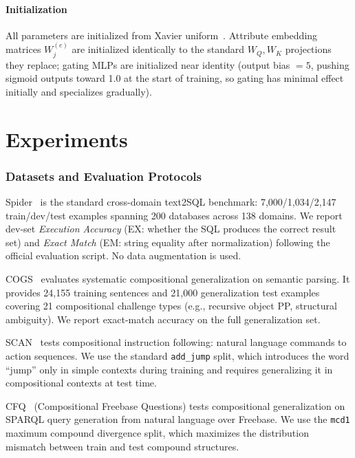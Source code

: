 \documentclass[conference]{IEEEtran}
\begin{document}
\paragraph{Initialization}
All parameters are initialized from Xavier uniform~\cite{vaswani2017attention}. Attribute embedding matrices $W_j^{(e)}$ are initialized identically to the standard $W_Q, W_K$ projections they replace; gating MLPs are initialized near identity (output bias $= 5$, pushing sigmoid outputs toward 1.0 at the start of training, so gating has minimal effect initially and specializes gradually).

\section{Experiments}
\label{sec:experiments}

\subsubsection{Datasets and Evaluation Protocols}

{Spider}~\cite{yu2018spider} is the standard cross-domain text2SQL benchmark: 7,000/1,034/2,147 train/dev/test examples spanning 200 databases across 138 domains. We report dev-set \emph{Execution Accuracy} (EX: whether the SQL produces the correct result set) and \emph{Exact Match} (EM: string equality after normalization) following the official evaluation script. No data augmentation is used.

{COGS}~\cite{kim2020cogs} evaluates systematic compositional generalization on semantic parsing. It provides 24,155 training sentences and 21,000 generalization test examples covering 21 compositional challenge types (e.g., recursive object PP, structural ambiguity). We report exact-match accuracy on the full generalization set.

{SCAN}~\cite{lake2018scan} tests compositional instruction following: natural language commands to action sequences. We use the standard \texttt{add\_jump} split, which introduces the word ``jump'' only in simple contexts during training and requires generalizing it in compositional contexts at test time.

{CFQ}~\cite{keysers2020measuring} (Compositional Freebase Questions) tests compositional generalization on SPARQL query generation from natural language over Freebase. We use the \texttt{mcd1} maximum compound divergence split, which maximizes the distribution mismatch between train and test compound structures.
\end{document}
